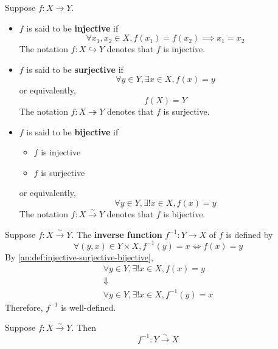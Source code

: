 \begin{definition} \label{an:def:injective-surjective-bijective}
  Suppose $f: X \to Y$.
  \begin{itemize}
    \item $f$ is said to be \textbf{injective} if
          \[
            \forall x_{1}, x_{2} \in X, f(x_{1}) = f(x_{2}) \implies x_{1} = x_{2}
          \]
          The notation $f: X \hookrightarrow Y$ denotes that $f$ is injective.
    \item $f$ is said to be \textbf{surjective} if
          \[
            \forall y \in Y, \exists x \in X, f(x) = y
          \]
          or equivalently,
          \[
            f(X) = Y
          \]
          The notation $f: X \twoheadrightarrow Y$ denotes that $f$ is surjective.
    \item $f$ is said to be \textbf{bijective} if
          \begin{itemize}
            \item $f$ is injective
            \item $f$ is surjective
          \end{itemize}
          or equivalently,
          \[
            \forall y \in Y, \exists! x \in X, f(x) = y
          \]
          The notation $f: X \xrightarrow{\sim} Y$ denotes that $f$ is bijective.
  \end{itemize}
\end{definition}

\bigskip

\begin{definition} \label{an:def:inverse-function}
  Suppose $f: X \xrightarrow{\sim} Y$. The \textbf{inverse function} $f^{-1}: Y \to X$ of $f$ is defined by
  \[
    \forall (y, x) \in Y \times X, f^{-1}(y) = x \iff f(x) = y
  \]
  By \cref{an:def:injective-surjective-bijective},
  \[
    \begin{array}{c}
      \forall y \in Y, \exists! x \in X, f(x) = y \\
      \Downarrow                                  \\
      \forall y \in Y, \exists! x \in X, f^{-1}(y) = x
    \end{array}
  \]
  Therefore, $f^{-1}$ is well-defined.
\end{definition}

\bigskip

\begin{theorem} \label{an:thm:inverse-function-is-bijective}
  Suppose $f: X \xrightarrow{\sim} Y$. Then
  \[
    f^{-1}: Y \xrightarrow{\sim} X
  \]
\end{theorem}

